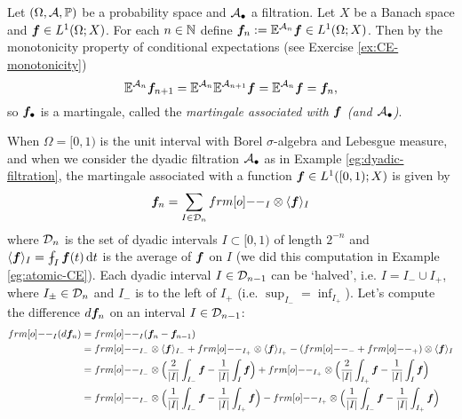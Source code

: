 \begin{example}
  Let $(\Omega, \mathcal{A}, \mathbb{P})$ be a probability space and $\mathcal{A}_{\bullet}$ a filtration.
  Let $X$ be a Banach space and $\bm{f} \in L^1(\Omega;X)$.
  For each $n \in \mathbb{N}$ define $\bm{f}_n := \mathbb{E}^{\mathcal{A}_n}\bm{f} \in L^1(\Omega;X)$.
  Then by the monotonicity property of conditional expectations (see Exercise \ref{ex:CE-monotonicity})
  \begin{equation*}
    \mathbb{E}^{\mathcal{A}_n} \bm{f}_{n+1} = \mathbb{E}^{\mathcal{A}_n} \mathbb{E}^{\mathcal{A}_{n+1}} \bm{f} = \mathbb{E}^{\mathcal{A}_n} \bm{f} = \bm{f}_n,
  \end{equation*}
  so $\bm{f}_{\bullet}$ is a martingale, called the \emph{martingale associated with $\bm{f}$ (and $\mathcal{A}_{\bullet}$)}. 

  When $\Omega = [0,1)$ is the unit interval with Borel $\sigma$-algebra and Lebesgue measure, and when we consider the dyadic filtration $\mathcal{A}_{\bullet}$ as in Example \ref{eg:dyadic-filtration}, the martingale associated with a function $\bm{f} \in L^1([0,1);X)$ is given by
  \begin{equation*}
    \mb{f}_n = \sum_{I \in \mc{D}_n} \1_I \otimes \langle \mb{f} \rangle_I
  \end{equation*}
  where $\mathcal{D}_n$ is the set of dyadic intervals $I \subset [0,1)$ of length $2^{-n}$ and $\langle \mb{f} \rangle_I = \fint_I \mb{f}(t) \, \dd t$ is the average of $\bm{f}$ on $I$ (we did this computation in Example \ref{eg:atomic-CE}).
  Each dyadic interval $I \in \mathcal{D}_{n-1}$ can be `halved', i.e. $I = I_{-} \cup I_{+}$, where $I_{\pm} \in \mathcal{D}_{n}$ and $I_-$ is to the left of $I_+$ (i.e. $\sup_{I_-} = \inf_{I_+}$).
  Let's compute the difference $d\bm{f}_n$ on an interval $I \in \mathcal{D}_{n-1}$:
  \begin{equation*}
    \begin{aligned}
      \1_{I}(d\mb{f}_{n}) &= \1_{I}(\mb{f}_{n} - \mb{f}_{n-1}) \\
      &= \1_{I_{-}} \otimes \langle \mb{f} \rangle_{I_{-}} + \1_{I_{+}} \otimes \langle \mb{f} \rangle_{I_{+}} - (\1_{-} + \1_{+}) \otimes \langle \mb{f} \rangle_{I} \\
      &= \1_{I_{-}} \otimes \Big( \frac{2}{|I|}\int_{I_{-}} \mb{f} - \frac{1}{|I|}\int_{I} \mb{f} \Big) + \1_{I_{+}} \otimes \Big( \frac{2}{|I|}\int_{I_{+}} \mb{f} - \frac{1}{|I|}\int_{I} \mb{f} \Big) \\
      &= \1_{I_{-}} \otimes \Big( \frac{1}{|I|}\int_{I_{-}} \mb{f} - \frac{1}{|I|}\int_{I_{+}} \mb{f} \Big) - \1_{I_{+}} \otimes \Big( \frac{1}{|I|}\int_{I_{-}} \mb{f} - \frac{1}{|I|}\int_{I_{+}} \mb{f} \Big) \\

\end{aligned}
\end{equation*}
\end{example}
